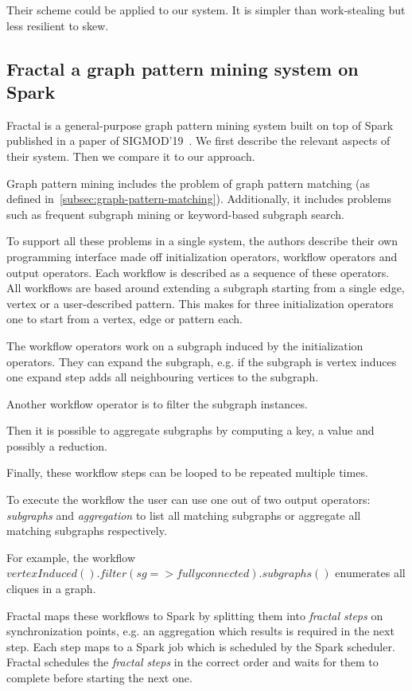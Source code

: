 Their scheme could be applied to our system.
It is simpler than work-stealing but less resilient to skew.



\subsection{Fractal a graph pattern mining system on Spark} \label{subsec:fractal}
Fractal is a general-purpose graph pattern mining system built on top of Spark published in
a paper of SIGMOD'19~\cite{fractal}.
We first describe the relevant aspects of their system.
Then we compare it to our approach.

Graph pattern mining includes the problem of graph pattern matching (as defined in~\cref{subsec:graph-pattern-matching}).
Additionally, it includes problems such as frequent subgraph mining or keyword-based subgraph search.

To support all these problems in a single system, the authors describe their own programming interface made
off initialization operators, workflow operators and output operators.
Each workflow is described as a sequence of these operators.
All workflows are based around extending a subgraph starting from a single edge, vertex or a user-described
pattern.
This makes for three initialization operators one to start from a vertex, edge or pattern each.

The workflow operators work on a subgraph induced by the initialization operators.
They can expand the subgraph, e.g. if the subgraph is vertex induces one expand step adds all neighbouring
vertices to the subgraph.

Another workflow operator is to filter the subgraph instances.

Then it is possible to aggregate subgraphs by computing a key, a value and possibly a reduction.

Finally, these workflow steps can be looped to be repeated multiple times.

To execute the workflow the user can use one out of two output operators: \textit{subgraphs} and
\textit{aggregation} to list all matching subgraphs or aggregate all matching subgraphs respectively.

For example, the workflow $vertexInduced().filter(sg => fully connected).subgraphs()$ enumerates
all cliques in a graph.

Fractal maps these workflows to Spark by splitting them into \textit{fractal steps} on
synchronization points, e.g. an aggregation which results is required in the next step.
Each step maps to a Spark job which is scheduled by the Spark scheduler.
Fractal schedules the \textit{fractal steps} in the correct order and waits for them to complete
before starting the next one.

